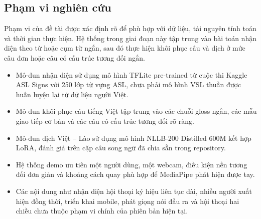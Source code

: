 ﻿\subsection{Phạm vi nghiên cứu}

Phạm vi của đề tài được xác định rõ để phù hợp với dữ liệu, tài nguyên tính toán và thời gian thực hiện. Hệ thống trong giai đoạn này tập trung vào bài toán nhận diện theo từ hoặc cụm từ ngắn, sau đó thực hiện khôi phục câu và dịch ở mức câu đơn hoặc câu có cấu trúc tương đối ngắn.

\begin{itemize}
    \item Mô-đun nhận diện sử dụng mô hình TFLite pre-trained từ cuộc thi Kaggle ASL Signs với 250 lớp từ vựng ASL, chưa phải mô hình VSL thuần được huấn luyện lại từ dữ liệu người Việt.
    \item Mô-đun khôi phục câu tiếng Việt tập trung vào các chuỗi gloss ngắn, các mẫu giao tiếp cơ bản và các câu có cấu trúc tương đối rõ ràng.
    \item Mô-đun dịch Việt -- Lào sử dụng mô hình NLLB-200 Distilled 600M kết hợp LoRA, đánh giá trên cặp câu song ngữ đã chia sẵn trong repository.
    \item Hệ thống demo ưu tiên một người dùng, một webcam, điều kiện nền tương đối đơn giản và khoảng cách quay phù hợp để MediaPipe phát hiện được tay.
    \item Các nội dung như nhận diện hội thoại ký hiệu liên tục dài, nhiều người xuất hiện đồng thời, triển khai mobile, phát giọng nói đầu ra và hội thoại hai chiều chưa thuộc phạm vi chính của phiên bản hiện tại.
\end{itemize}

